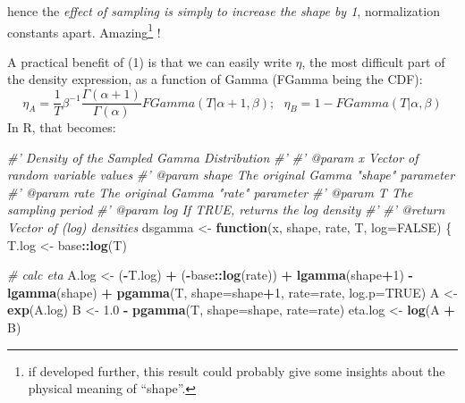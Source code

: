 \documentclass[]{article}
\newenvironment{Shaded}{\begin{snugshade}}{\end{snugshade}}
\newcommand{\CommentTok}[1]{\textcolor[rgb]{0.56,0.35,0.01}{\textit{#1}}}
\newcommand{\ControlFlowTok}[1]{\textcolor[rgb]{0.13,0.29,0.53}{\textbf{#1}}}
\newcommand{\DataTypeTok}[1]{\textcolor[rgb]{0.13,0.29,0.53}{#1}}
\newcommand{\DecValTok}[1]{\textcolor[rgb]{0.00,0.00,0.81}{#1}}
\newcommand{\FloatTok}[1]{\textcolor[rgb]{0.00,0.00,0.81}{#1}}
\newcommand{\KeywordTok}[1]{\textcolor[rgb]{0.13,0.29,0.53}{\textbf{#1}}}
\newcommand{\NormalTok}[1]{#1}
\newcommand{\OperatorTok}[1]{\textcolor[rgb]{0.81,0.36,0.00}{\textbf{#1}}}
\newcommand{\OtherTok}[1]{\textcolor[rgb]{0.56,0.35,0.01}{#1}}
\newcommand{\StringTok}[1]{\textcolor[rgb]{0.31,0.60,0.02}{#1}}
\begin{document}
hence the \emph{effect of sampling is simply to increase the shape by
1}, normalization constants apart. Amazing\footnote{if developed
  further, this result could probably give some insights about the
  physical meaning of ``shape''.} !

A practical benefit of (1) is that we can easily write \(\eta\), the
most difficult part of the density expression, as a function of Gamma
(FGamma being the CDF): \[
  \eta_A = \frac{1}{T} \beta^{-1} \frac{\Gamma(\alpha+1)}{\Gamma(\alpha)}FGamma(T|\alpha+1,\beta);\ \ \  \eta_B = 1 - FGamma(T|\alpha,\beta)
\] In R, that becomes:

\begin{Shaded}
\begin{Highlighting}[]
\CommentTok{#' Density of the Sampled Gamma Distribution}
\CommentTok{#'}
\CommentTok{#' @param x     Vector of random variable values}
\CommentTok{#' @param shape The original Gamma "shape" parameter}
\CommentTok{#' @param rate  The original Gamma "rate" parameter}
\CommentTok{#' @param T     The sampling period}
\CommentTok{#' @param log   If TRUE, returns the log density}
\CommentTok{#'}
\CommentTok{#' @return Vector of (log) densities}
\NormalTok{dsgamma <-}\StringTok{ }\ControlFlowTok{function}\NormalTok{(x, shape, rate, T, }\DataTypeTok{log=}\OtherTok{FALSE}\NormalTok{) \{}
\NormalTok{  T.log <-}\StringTok{ }\NormalTok{base}\OperatorTok{::}\KeywordTok{log}\NormalTok{(T)}
  
  \CommentTok{# calc eta}
\NormalTok{  A.log <-}\StringTok{ }\NormalTok{(}\OperatorTok{-}\NormalTok{T.log) }\OperatorTok{+}\StringTok{ }
\StringTok{           }\NormalTok{(}\OperatorTok{-}\NormalTok{base}\OperatorTok{::}\KeywordTok{log}\NormalTok{(rate)) }\OperatorTok{+}\StringTok{ }
\StringTok{           }\KeywordTok{lgamma}\NormalTok{(shape}\OperatorTok{+}\DecValTok{1}\NormalTok{) }\OperatorTok{-}\StringTok{ }\KeywordTok{lgamma}\NormalTok{(shape) }\OperatorTok{+}\StringTok{ }\KeywordTok{pgamma}\NormalTok{(T, }\DataTypeTok{shape=}\NormalTok{shape}\OperatorTok{+}\DecValTok{1}\NormalTok{, }\DataTypeTok{rate=}\NormalTok{rate, }\DataTypeTok{log.p=}\OtherTok{TRUE}\NormalTok{) }
\NormalTok{  A <-}\StringTok{ }\KeywordTok{exp}\NormalTok{(A.log)}
\NormalTok{  B <-}\StringTok{ }\FloatTok{1.0} \OperatorTok{-}\StringTok{ }\KeywordTok{pgamma}\NormalTok{(T, }\DataTypeTok{shape=}\NormalTok{shape, }\DataTypeTok{rate=}\NormalTok{rate) }
\NormalTok{  eta.log <-}\StringTok{ }\KeywordTok{log}\NormalTok{(A }\OperatorTok{+}\StringTok{ }\NormalTok{B)}
  

\end{Highlighting}
\end{Shaded}
\end{document}
